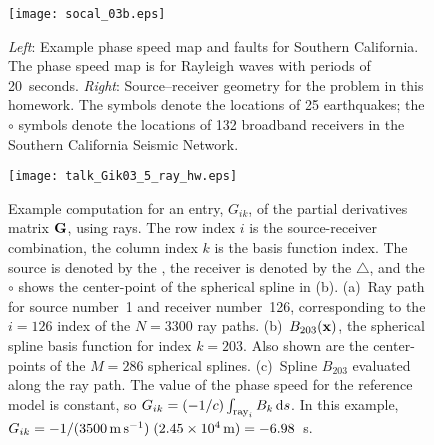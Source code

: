 \documentclass[11pt,titlepage,fleqn]{article}
\begin{document}
\clearpage\pagebreak

\begin{figure}
\hspace{-0.5cm}
\texttt{[image: socal\_03b.eps]}
\caption[Source--receiver geometry for southern California]
{{
{\em Left}: Example phase speed map and faults for Southern California. The phase speed map is for Rayleigh waves with periods of 20~seconds.
{\em Right}: Source--receiver geometry for the problem in this homework. The  symbols denote the locations of 25 earthquakes; the $\circ$ symbols denote the locations of 132 broadband receivers in the Southern California Seismic Network.
\label{fig:geometry}
}}
\end{figure}

\begin{figure}[p]
\hspace{-1.5cm}
\texttt{[image: talk\_Gik03\_5\_ray\_hw.eps]}
\caption[Basis function]
{{
Example computation for an entry, $G_{ik}$, of the partial derivatives matrix $\mbox{${\bf G}$}$, using rays. The row index $i$ is the source-receiver combination, the column index $k$ is the basis function index. The source is denoted by the , the receiver is denoted by the $\triangle$, and the $\circ$ shows the center-point of the spherical spline in (b).
(a)~Ray path for source number~1 and receiver number~126, corresponding to the $i=126$ index of the $N=3300$ ray paths.
(b)~$B_{203}(\mbox{${\bf x}$})$, the spherical spline basis function for index $k=203$. Also shown are the center-points of the $M=286$ spherical splines.
(c)~Spline $B_{203}$ evaluated along the ray path. The value of the phase speed for the reference model is constant, so $G_{ik} = (-1/c) \int_{{\rm ray}_i} B_k\,\mathrm{d} s$. In this example, $G_{ik} = -1/(3500\,{\rm m\,s^{-1}})\;(2.45 \times 10^4\,{\rm m})  = -6.98$~s. 
\label{fig:basis}
}}
\end{figure}

\end{document}
